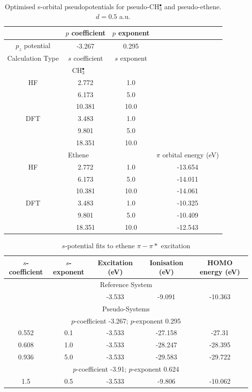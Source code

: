 \documentclass[journal=jctcce,manuscript=article]{achemso}
\begin{document}
\begin{table}[ht]
\caption{Optimised s-orbital pseudopotentials for pseudo-CH\(^{\bullet}_{3}\) and pseudo-ethene. \(d = 0.5\) a.u.}
\begin{tabular}{c c c c}
\hline
& \(p\) coefficient & \(p\) exponent \\
\hline
\(p_{z}\) potential & -3.267 & 0.295 \\
\hline
Calculation Type & \(s\) coefficient & \(s\) exponent &  \\
\hline
\multicolumn{3}{c}{CH\(^{\bullet}_{3}\)} \\
\hline\hline
HF & 2.772 & 1.0 &  \\
 & 6.173 & 5.0 &  \\
 & 10.381 & 10.0 &  \\
\hline
DFT & 3.483 & 1.0 &  \\
 & 9.801 & 5.0 &  \\
 & 18.351 & 10.0 &  \\
\hline
\multicolumn{3}{c}{Ethene} & \(\pi\) orbital energy (eV) \\
\hline\hline
HF & 2.772 & 1.0 & -13.654 \\
 & 6.173 & 5.0 & -14.011 \\
 & 10.381 & 10.0 & -14.061 \\
\hline
DFT & 3.483 & 1.0 & -10.325 \\
 & 9.801 & 5.0 & -10.409 \\
 & 18.351 & 10.0 & -12.543 \\
\hline
\end{tabular}
\label{table:p_potentials}
\end{table}

\begin{table}[ht]
\caption{\(s\)-potential fits to ethene \(\pi-\pi*\) excitation}
\begin{tabular}{c c c c c}
\hline
\(s\)-coefficient & \(s\)-exponent & Excitation (eV) & Ionisation (eV) & HOMO energy (eV) \\
\hline
\multicolumn{5}{c}{Reference System} \\
\hline\hline
& & -3.533 & -9.091 & -10.363 \\
\hline
\multicolumn{5}{c}{Pseudo-Systems} \\
\hline\hline
\multicolumn{5}{c}{\(p\)-coefficient -3.267; \(p\)-exponent 0.295} \\
\hline
0.552 & 0.1 & -3.533 & -27.158 & -27.31 \\
0.608 & 1.0 & -3.533 & -28.247 & -28.395 \\
0.936 & 5.0 & -3.533 & -29.583 & -29.722 \\
\hline
\multicolumn{5}{c}{\(p\)-coefficient -3.91; \(p\)-exponent 0.624} \\
\hline
1.5 & 0.5 & -3.533 & -9.806 & -10.062 \\
\hline
\end{tabular}
\label{table:ethene_excitations}
\end{table}
\end{document}
